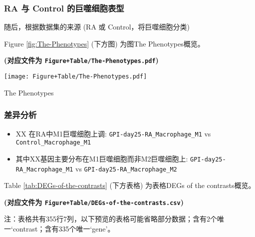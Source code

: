 \documentclass[
]{article}
\providecommand{\tightlist}{%
  \setlength{\itemsep}{0pt}\setlength{\parskip}{0pt}}
\begin{document}
\hypertarget{ra-ux4e0e-control-ux7684ux5de8ux566cux7ec6ux80deux8868ux578b}{%
\subsubsection{RA 与 Control 的巨噬细胞表型}\label{ra-ux4e0e-control-ux7684ux5de8ux566cux7ec6ux80deux8868ux578b}}

随后，根据数据集的来源 (RA 或 Control，将巨噬细胞分类)

Figure \ref{fig:The-Phenotypes} (下方图) 为图The Phenotypes概览。

\textbf{(对应文件为 \texttt{Figure+Table/The-Phenotypes.pdf})}

\def\@captype{figure}
\begin{center}
\texttt{[image: Figure+Table/The-Phenotypes.pdf]}
\caption{The Phenotypes}\label{fig:The-Phenotypes}
\end{center}

\hypertarget{ux5deeux5f02ux5206ux6790}{%
\subsubsection{差异分析}\label{ux5deeux5f02ux5206ux6790}}

\begin{itemize}
\tightlist
\item
  XX 在RA中M1巨噬细胞上调: \texttt{GPI-day25-RA\_Macrophage\_M1} vs \texttt{Control\_Macrophage\_M1}
\item
  其中XX基因主要分布在M1巨噬细胞而非M2巨噬细胞上: \texttt{GPI-day25-RA\_Macrophage\_M1} vs \texttt{GPI-day25-RA\_Macrophage\_M2}
\end{itemize}

Table \ref{tab:DEGs-of-the-contrasts} (下方表格) 为表格DEGs of the contrasts概览。

\textbf{(对应文件为 \texttt{Figure+Table/DEGs-of-the-contrasts.csv})}

\begin{center}\begin{tcolorbox}[colback=gray!10, colframe=gray!50, width=0.9\linewidth, arc=1mm, boxrule=0.5pt]注：表格共有355行7列，以下预览的表格可能省略部分数据；含有2个唯一`contrast；含有335个唯一`gene'。
\end{tcolorbox}
\end{center}
\end{document}
